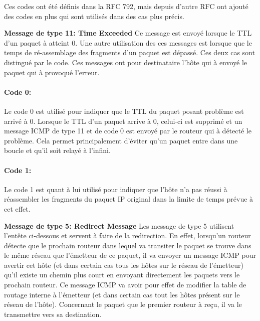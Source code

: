 Ces codes ont été définis dans la RFC 792, mais depuis d'autre RFC ont ajouté
des codes en plus qui sont utilisés dans des cas plus précis.

\vspace{1cm}
\textbf{Message de type 11: Time Exceeded}
Ce message est envoyé lorsque le TTL d'un paquet à atteint 0. Une autre
utilisation des ces messages est lorsque que le temps de ré-assemblage des
fragments d'un paquet est dépassé. Ces deux cas sont distingué par le code. Ces
messages ont pour destinataire l'hôte qui à envoyé le paquet qui à provoqué
l'erreur.

\paragraph{Code 0:}
Le code 0 est utilisé pour indiquer que le TTL du paquet posant problème est
arrivé à 0.  Lorsque le TTL d'un paquet arrive à 0, celui-ci est supprimé et un
message ICMP de type 11 et de code 0 est envoyé par le routeur qui à détecté le
problème. Cela permet principalement d'éviter qu'un paquet entre dans une
boucle et qu'il soit relayé à l'infini.

\paragraph{Code 1:} Le code 1 est quant à lui utilisé pour indiquer que l'hôte
n'a pas réussi à réassembler les fragments du paquet IP original dans la limite
de temps prévue à cet effet.


\vspace{1cm}
\textbf{Message de type 5: Redirect Message} Les message de type 5 utilisent
l'entête ci-dessous et servent à faire de la redirection. En effet, lorsqu'un
routeur détecte que le prochain routeur dans lequel va transiter le paquet se
trouve dans le même réseau que l'émetteur de ce paquet, il va envoyer un
message ICMP pour avertir cet hôte (et dans certain cas tous les hôtes sur le
réseau de l'émetteur) qu'il existe un chemin plus court en envoyant directement
les paquets vers le prochain routeur. Ce message ICMP va avoir pour effet de
modifier la table de routage interne à l'émetteur (et dans certain cas tout les
hôtes présent sur le réseau de l'hôte). Concernant le paquet que le premier
routeur à reçu, il va le transmettre vers sa destination.



